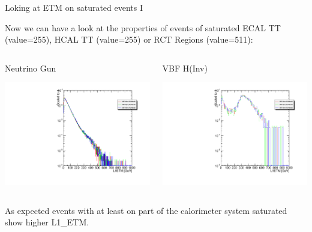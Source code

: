 \documentclass[8pt]{beamer}
\begin{document}
\begin{frame}{Loking at ETM on saturated events I}

Now we can have a look at the properties of events of saturated ECAL TT (value=255), HCAL TT (value=255) or RCT Regions (value=511):

\begin{columns}
 
\begin{block}{Neutrino Gun}
\centering

\includegraphics[width=\linewidth]{fig/L1ETM_Sig.pdf}

\end{block}

\begin{block}{VBF H(Inv)}
\centering

\includegraphics[width=\linewidth]{fig/L1ETM_Saturated_Sig.pdf}

\end{block}

\end{columns}

As expected events with at least on part of the calorimeter system saturated show higher L1\_ETM.

\end{frame}
\end{document}
